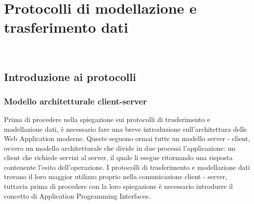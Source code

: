 
\chapter{Protocolli di modellazione e trasferimento dati}
\label{cap:protocolli-trasmissione-dati}

\\

\section{Introduzione ai protocolli}
\subsection*{Modello architetturale client-server}
\label{client-server}
Prima di procedere nella spiegazione sui protocolli di trasferimento e modellazione dati, è necessario fare una breve introduzione sull'architettura delle Web Application moderne. Queste seguono ormai tutte un modello server - client, ovvero un modello architetturale che divide in due processi l'applicazione: un client che richiede servizi al server, il quale li esegue ritornando una risposta contenente l'esito dell'operazione. I protocolli di trasferimento e modellazione dati trovano il loro maggior utilizzo proprio nella comunicazione client - server, tuttavia prima di procedere con la loro spiegazione è necessario introdurre il concetto di Application Programming Interfaces.
